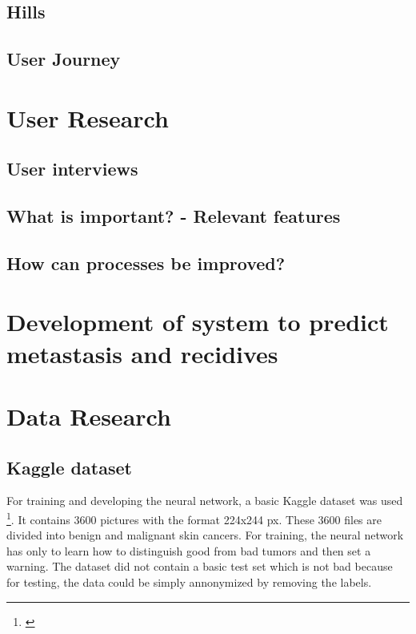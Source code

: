 \subsection{Hills}


\subsection{User Journey}


\section{User Research}
\subsection{User interviews}
\subsection{What is important? - Relevant features}
\subsection{How can processes be improved?}


\section{Development of system to predict metastasis and recidives} 

\section{Data Research}
\subsection{Kaggle dataset}
For training and developing the neural network, a basic Kaggle dataset was used \footnote{\cite{kaggle_dataset}}. It contains 3600 pictures with the format 224x244 px. These 3600 files are divided into benign and malignant skin cancers. 
For training, the neural network has only to learn how to distinguish good from bad tumors and then set a warning. 
The dataset did not contain a basic test set which is not bad because for testing, the data could be simply annonymized by removing the labels.

